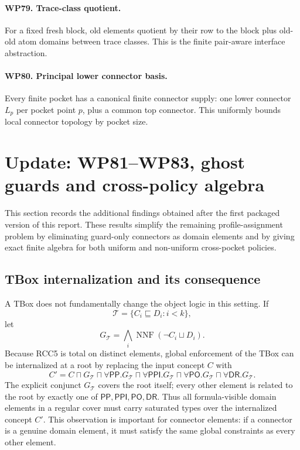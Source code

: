 \documentclass[11pt]{article}
\newcommand{\PP}{\mathsf{PP}}
\newcommand{\PPI}{\mathsf{PPI}}
\newcommand{\PO}{\mathsf{PO}}
\newcommand{\DR}{\mathsf{DR}}
\begin{document}
\paragraph{WP79. Trace-class quotient.}
For a fixed fresh block, old elements quotient by their row to the block plus old-old atom domains between trace classes.  This is the finite pair-aware interface abstraction.

\paragraph{WP80. Principal lower connector basis.}
Every finite pocket has a canonical finite connector supply: one lower connector $L_p$ per pocket point $p$, plus a common top connector.  This uniformly bounds local connector topology by pocket size.


\section{Update: WP81--WP83, ghost guards and cross-policy algebra}

This section records the additional findings obtained after the first packaged version of this report.  These results simplify the remaining profile-assignment problem by eliminating guard-only connectors as domain elements and by giving exact finite algebra for both uniform and non-uniform cross-pocket policies.

\subsection{TBox internalization and its consequence}
A TBox does not fundamentally change the object logic in this setting.  If
\[
\mathcal T=\{C_i\sqsubseteq D_i:i<k\},
\]
let
\[
G_{\mathcal T}=\bigwedge_i \operatorname{NNF}(\neg C_i\sqcup D_i).
\]
Because RCC5 is total on distinct elements, global enforcement of the TBox can be internalized at a root by replacing the input concept $C$ with
\[
C' = C\sqcap G_{\mathcal T}\sqcap
\forall\PP.G_{\mathcal T}\sqcap
\forall\PPI.G_{\mathcal T}\sqcap
\forall\PO.G_{\mathcal T}\sqcap
\forall\DR.G_{\mathcal T}.
\]
The explicit conjunct $G_{\mathcal T}$ covers the root itself; every other element is related to the root by exactly one of $\PP,\PPI,\PO,\DR$.  Thus all formula-visible domain elements in a regular cover must carry saturated types over the internalized concept $C'$.  This observation is important for connector elements: if a connector is a genuine domain element, it must satisfy the same global constraints as every other element.
\end{document}
